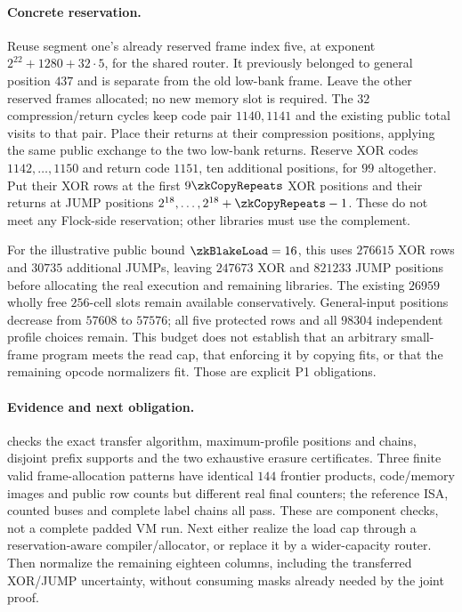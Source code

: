 \paragraph{Concrete reservation.} Reuse segment one's already reserved frame index five, at exponent $2^{22}+1280+32\cdot5$, for the shared router. It previously belonged to general position $437$ and is separate from the old low-bank frame. Leave the other reserved frames allocated; no new memory slot is required. The $32$ compression/return cycles keep code pair $1140,1141$ and the existing public total visits to that pair. Place their returns at their compression positions, applying the same public exchange to the two low-bank returns. Reserve XOR codes $1142,\ldots,1150$ and return code $1151$, ten additional positions, for $99$ altogether. Put their XOR rows at the first $9\zkCopyRepeats$ XOR positions and their returns at JUMP positions $2^{18},\ldots,2^{18}+\zkCopyRepeats-1$. These do not meet any Flock-side reservation; other libraries must use the complement.

For the illustrative public bound $\zkBlakeLoad=16$, this uses $276615$ XOR rows and $30735$ additional JUMPs, leaving $247673$ XOR and $821233$ JUMP positions before allocating the real execution and remaining libraries. The existing $26959$ wholly free $256$-cell slots remain available conservatively. General-input positions decrease from $57608$ to $57576$; all five protected rows and all $98304$ independent profile choices remain. This budget does not establish that an arbitrary small-frame program meets the read cap, that enforcing it by copying fits, or that the remaining opcode normalizers fit. Those are explicit P1 obligations.

\paragraph{Evidence and next obligation.}  checks the exact transfer algorithm, maximum-profile positions and chains, disjoint prefix supports and the two exhaustive erasure certificates. Three finite valid frame-allocation patterns have identical $144$ frontier products, code/memory images and public row counts but different real final counters; the reference ISA, counted buses and complete label chains all pass. These are component checks, not a complete padded VM run. Next either realize the load cap through a reservation-aware compiler/allocator, or replace it by a wider-capacity router. Then normalize the remaining eighteen columns, including the transferred XOR/JUMP uncertainty, without consuming masks already needed by the joint proof.

